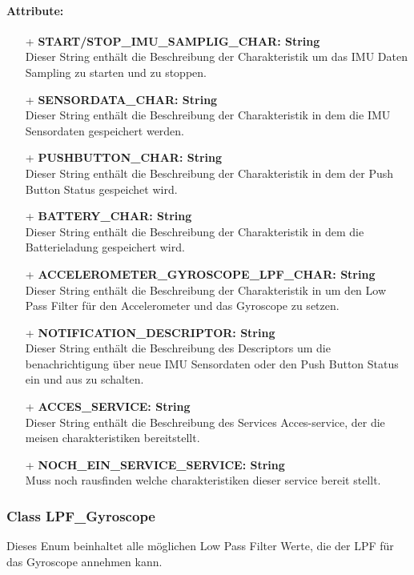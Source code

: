 \documentclass[a4paper,12pt]{article}
\begin{document}
\paragraph{Attribute:}
\begin{itemize}
	\item[+] \textbf{START/STOP\_IMU\_SAMPLIG\_CHAR: String}\\Dieser String enthält die Beschreibung der Charakteristik um das IMU Daten Sampling zu starten und zu stoppen.
	\item[+] \textbf{SENSORDATA\_CHAR: String}\\Dieser String enthält die Beschreibung der Charakteristik in dem die IMU Sensordaten gespeichert werden.
	\item[+] \textbf{PUSHBUTTON\_CHAR: String}\\Dieser String enthält die Beschreibung der Charakteristik in dem der Push Button Status gespeichet wird.
	\item[+] \textbf{BATTERY\_CHAR: String}\\Dieser String enthält die Beschreibung der Charakteristik in dem die Batterieladung gespeichert wird.
	\item[+] \textbf{ACCELEROMETER\_GYROSCOPE\_LPF\_CHAR: String}\\Dieser String enthält die Beschreibung der Charakteristik in um den Low Pass Filter für den Accelerometer und das Gyroscope zu setzen.
	\item[+] \textbf{NOTIFICATION\_DESCRIPTOR: String}\\Dieser String enthält die Beschreibung des Descriptors um die benachrichtigung über neue IMU Sensordaten oder den Push Button Status ein und aus zu schalten.
\item[+] \textbf{ACCES\_SERVICE: String}\\Dieser String enthält die Beschreibung des Services Acces-service, der die meisen charakteristiken bereitstellt.
\item[+] \textbf{NOCH\_EIN\_SERVICE\_SERVICE: String}\\Muss noch rausfinden welche charakteristiken dieser service bereit stellt.
\end{itemize}


\subsubsection{Class LPF\_Gyroscope}
Dieses Enum beinhaltet alle möglichen Low Pass Filter Werte, die der LPF für das Gyroscope annehmen kann.
\end{document}
